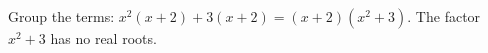 Group the terms: $x^2(x+2)+3(x+2)=\boxed{(x+2)\left(x^2+3\right)}$. The factor $x^2+3$ has no real roots.

